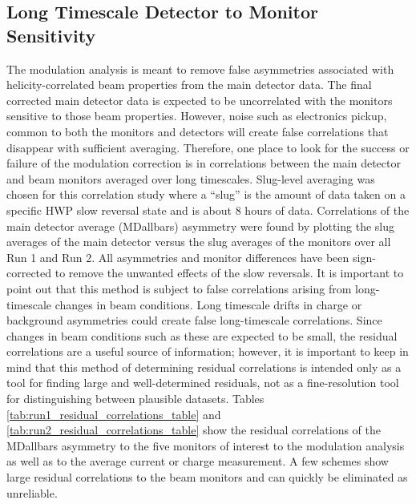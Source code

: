\subsection{Long Timescale Detector to Monitor Sensitivity}
\label{sctn:residual_correlations}
The modulation analysis is meant to remove false asymmetries associated with helicity-correlated beam properties from the main detector data. The final corrected main detector data is expected to be uncorrelated with the monitors sensitive to those beam properties. However, noise such as electronics pickup, common to both the monitors and detectors will create false correlations that disappear with sufficient averaging. Therefore, one place to look for the success or failure of the modulation correction is in correlations between the main detector and beam monitors averaged over long timescales. Slug-level averaging was chosen for this correlation study where a ``slug'' is the amount of data taken on a specific HWP slow reversal state and is about 8 hours of data. Correlations of the main detector average (MDallbars) asymmetry were found by plotting the slug averages of the main detector versus the slug averages of the monitors over all Run 1 and Run 2. All asymmetries and monitor differences have been sign-corrected to remove the unwanted effects of the slow reversals. It is important to point out that this method is subject to false correlations arising from long-timescale changes in beam conditions. Long timescale drifts in charge or background asymmetries could create false long-timescale correlations. Since changes in beam conditions such as these are expected to be small, the residual correlations are a useful source of information; however, it is important to keep in mind that this method of determining residual correlations is intended only as a tool for finding large and well-determined residuals, not as a fine-resolution tool for distinguishing between plausible datasets. Tables \ref{tab:run1_residual_correlations_table} and  \ref{tab:run2_residual_correlations_table} show the residual correlations of the MDallbars asymmetry to the five monitors of interest to the modulation analysis as well as to the average current or charge measurement. A few schemes show large residual correlations to the beam monitors and can quickly be eliminated as unreliable. 

